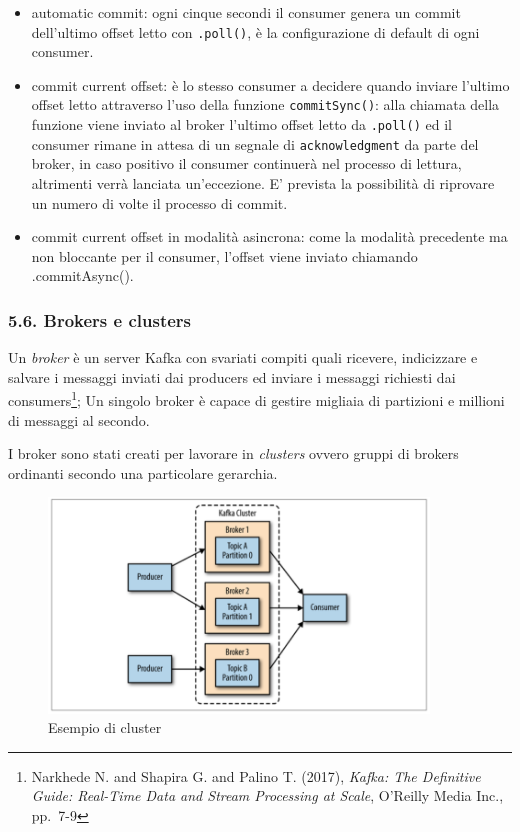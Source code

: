 \documentclass[]{article}
\providecommand{\tightlist}{%
  \setlength{\itemsep}{0pt}\setlength{\parskip}{0pt}}
\begin{document}
\begin{itemize}
\tightlist
\item
  automatic commit: ogni cinque secondi il consumer genera un commit
  dell'ultimo offset letto con \texttt{.poll()}, è la configurazione di
  default di ogni consumer.
\item
  commit current offset: è lo stesso consumer a decidere quando inviare
  l'ultimo offset letto attraverso l'uso della funzione
  \texttt{commitSync()}: alla chiamata della funzione viene inviato al
  broker l'ultimo offset letto da \texttt{.poll()} ed il consumer rimane
  in attesa di un segnale di \texttt{acknowledgment} da parte del
  broker, in caso positivo il consumer continuerà nel processo di
  lettura, altrimenti verrà lanciata un'eccezione. E' prevista la
  possibilità di riprovare un numero di volte il processo di commit.
\item
  commit current offset in modalità asincrona: come la modalità
  precedente ma non bloccante per il consumer, l'offset viene inviato
  chiamando .commitAsync().
\end{itemize}

\subsubsection{5.6. Brokers e clusters}\label{brokers-e-clusters}

Un \emph{broker} è un server Kafka con svariati compiti quali ricevere,
indicizzare e salvare i messaggi inviati dai producers ed inviare i
messaggi richiesti dai consumers\footnote{Narkhede N. and Shapira G. and
  Palino T. (2017), \emph{Kafka: The Definitive Guide: Real-Time Data
  and Stream Processing at Scale}, O'Reilly Media Inc., pp.~7-9}; Un
singolo broker è capace di gestire migliaia di partizioni e millioni di
messaggi al secondo.

I broker sono stati creati per lavorare in \emph{clusters} ovvero gruppi
di brokers ordinanti secondo una particolare gerarchia.

\begin{figure}
\centering
\includegraphics[width=0.90000\textwidth]{../images/kafka-cluster.png}
\caption{Esempio di cluster \label{figure_5}}
\end{figure}
\end{document}
